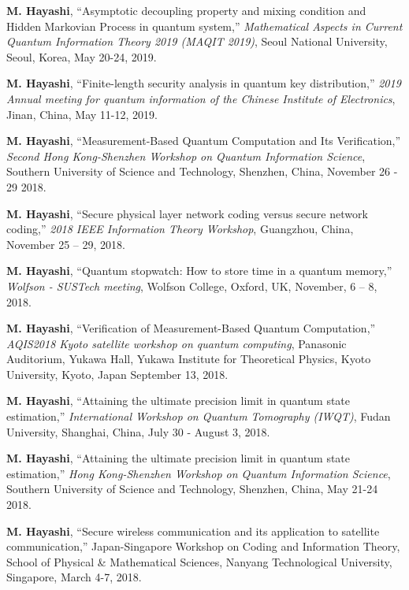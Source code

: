 \documentclass[a4paper,12pt,oneside]{article}
\begin{document}
\begin{enumerate}
\textbf{M. Hayashi}, 
``Asymptotic decoupling property and mixing condition and Hidden Markovian Process in quantum system,''
{\em Mathematical Aspects in Current Quantum Information Theory 2019 (MAQIT 2019)}, 
Seoul National University, Seoul, Korea,
May 20-24, 2019. 

\textbf{M. Hayashi}, 
``Finite-length security analysis in quantum key distribution,''
{\em 2019 Annual meeting for quantum information of the Chinese Institute of Electronics},
Jinan, China,
May 11-12, 2019.

\textbf{M. Hayashi}, 
``Measurement-Based Quantum Computation and Its Verification,''
{\em Second Hong Kong-Shenzhen Workshop on Quantum Information Science}, 
Southern University of Science and Technology, Shenzhen, China,
November 26 - 29 2018.

\textbf{M. Hayashi}, 
``Secure physical layer network coding versus secure network coding,''
{\em 2018 IEEE Information Theory Workshop}, 
Guangzhou, China, November 25 -- 29, 2018.

\textbf{M. Hayashi}, 
``Quantum stopwatch: How to store time in a quantum memory,''
{\em Wolfson - SUSTech meeting}, 
Wolfson College, Oxford, UK, November, 6 -- 8,  2018.

\textbf{M. Hayashi}, 
``Verification of Measurement-Based Quantum Computation,''
{\em AQIS2018 Kyoto satellite workshop on quantum computing}, 
Panasonic Auditorium, Yukawa Hall, Yukawa Institute for Theoretical Physics, Kyoto University, Kyoto, Japan
September 13, 2018.

\textbf{M. Hayashi}, 
``Attaining the ultimate precision limit in quantum state estimation,''
{\em International Workshop on Quantum Tomography (IWQT)}, 
Fudan University, Shanghai, China,
July 30 - August 3, 2018.


\textbf{M. Hayashi}, 
``Attaining the ultimate precision limit in quantum state estimation,''
{\em Hong Kong-Shenzhen Workshop on Quantum Information Science}, 
Southern University of Science and Technology, Shenzhen, China,
May 21-24 2018.

\textbf{M. Hayashi}, ``Secure wireless communication and its application to 
satellite communication,'' 
Japan-Singapore Workshop on Coding and Information Theory, 
School of Physical \& Mathematical Sciences,
Nanyang Technological University,
Singapore, March 4-7, 2018.



\end{enumerate}
\end{document}

